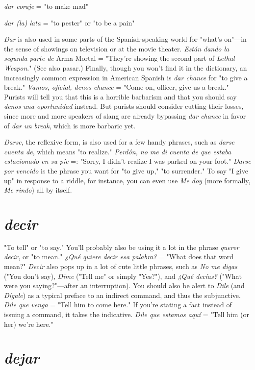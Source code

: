 \indu \emph{dar coraje} = "to make mad"

\indu \emph{dar (la) lata} = "to pester" or "to be a pain"

\bsk

\emph{Dar} is also used in some parts of the Spanish-speaking world for
"what's on"---in the sense of showings on television or at the movie
theater. \emph{Están dando la segunda parte de} Arma Mortal = "They're
showing the second part of \emph{Lethal Weapon}." (See also pasar.) Finally,
though you won't find it in the dictionary, an increasingly common expression in American Spanish is \emph{dar chance} for "to give a break." \emph{Vamos, oficial, denos chance} = "Come on, officer, give us a break." Purists will tell you that this is a horrible barbarism and that you should
say \emph{denos una oportunidad} instead. But purists should consider cutting their losses, since more and more speakers of slang are already bypassing \emph{dar chance} in favor of \emph{dar un break}, which is more barbaric yet.

\emph{Darse}, the reflexive form, is also used for a few handy phrases,
such as \emph{darse cuenta de}, which means "to realize." \emph{Perdón, no me di
cuenta de que estaba estacionado en su pie} =: "Sorry, I didn't realize
I was parked on your foot." \emph{Darse por vencido} is the phrase you want
for "to give up," "to surrender." To say "I give up" in response to a
riddle, for instance, you can even use \emph{Me doy} (more formally, \emph{Me rindo}) all by itself.

\section{\emph{decir}}

"To tell" or "to say." You'll probably also be using it a lot in
the phrase \emph{querer decir}, or "to mean." \emph{¿Qué quiere decir esa palabra?}
= "What does that word mean?" \emph{Decir} also pops up in a lot of cute
little phrases, such as \emph{No me digas} ("You don't say), \emph{Dime} ("Tell me"
or simply "Yes?"), and \emph{¿Qué decías?} ("What were you saying?"---after
an interruption). You should also be alert to \emph{Dile} (and \emph{Dígale}) as a typical preface to an indirect command, and thus the subjunctive. \emph{Dile que
venga} = "Tell him to come here." If you're stating a fact instead of
issuing a command, it takes the indicative. \emph{Dile que estamos aquí} =
"Tell him (or her) we're here."

\section{\emph{dejar}}

